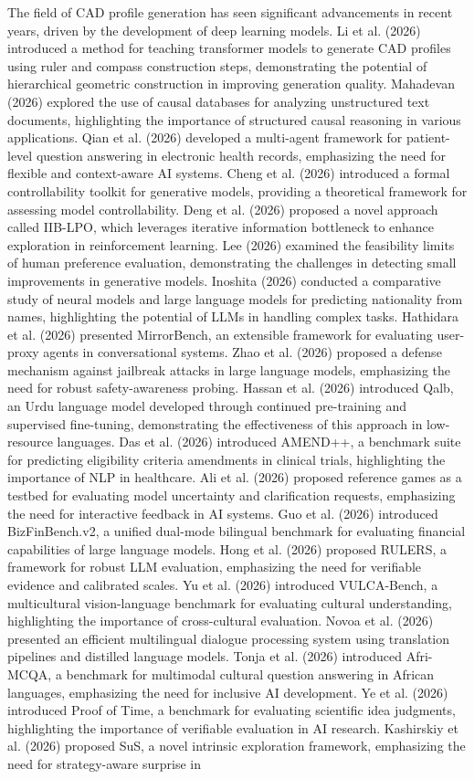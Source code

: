 The field of CAD profile generation has seen significant advancements in recent years, driven by the development of deep learning models. Li et al. (2026) introduced a method for teaching transformer models to generate CAD profiles using ruler and compass construction steps, demonstrating the potential of hierarchical geometric construction in improving generation quality. Mahadevan (2026) explored the use of causal databases for analyzing unstructured text documents, highlighting the importance of structured causal reasoning in various applications. Qian et al. (2026) developed a multi-agent framework for patient-level question answering in electronic health records, emphasizing the need for flexible and context-aware AI systems. Cheng et al. (2026) introduced a formal controllability toolkit for generative models, providing a theoretical framework for assessing model controllability. Deng et al. (2026) proposed a novel approach called IIB-LPO, which leverages iterative information bottleneck to enhance exploration in reinforcement learning. Lee (2026) examined the feasibility limits of human preference evaluation, demonstrating the challenges in detecting small improvements in generative models. Inoshita (2026) conducted a comparative study of neural models and large language models for predicting nationality from names, highlighting the potential of LLMs in handling complex tasks. Hathidara et al. (2026) presented MirrorBench, an extensible framework for evaluating user-proxy agents in conversational systems. Zhao et al. (2026) proposed a defense mechanism against jailbreak attacks in large language models, emphasizing the need for robust safety-awareness probing. Hassan et al. (2026) introduced Qalb, an Urdu language model developed through continued pre-training and supervised fine-tuning, demonstrating the effectiveness of this approach in low-resource languages. Das et al. (2026) introduced AMEND++, a benchmark suite for predicting eligibility criteria amendments in clinical trials, highlighting the importance of NLP in healthcare. Ali et al. (2026) proposed reference games as a testbed for evaluating model uncertainty and clarification requests, emphasizing the need for interactive feedback in AI systems. Guo et al. (2026) introduced BizFinBench.v2, a unified dual-mode bilingual benchmark for evaluating financial capabilities of large language models. Hong et al. (2026) proposed RULERS, a framework for robust LLM evaluation, emphasizing the need for verifiable evidence and calibrated scales. Yu et al. (2026) introduced VULCA-Bench, a multicultural vision-language benchmark for evaluating cultural understanding, highlighting the importance of cross-cultural evaluation. Novoa et al. (2026) presented an efficient multilingual dialogue processing system using translation pipelines and distilled language models. Tonja et al. (2026) introduced Afri-MCQA, a benchmark for multimodal cultural question answering in African languages, emphasizing the need for inclusive AI development. Ye et al. (2026) introduced Proof of Time, a benchmark for evaluating scientific idea judgments, highlighting the importance of verifiable evaluation in AI research. Kashirskiy et al. (2026) proposed SuS, a novel intrinsic exploration framework, emphasizing the need for strategy-aware surprise in 